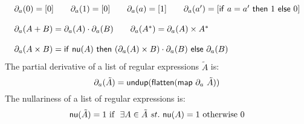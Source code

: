 \begin{definition}
  \begin{displaymath}
    \begin{array}{lll}
\partial_{a}(0) = [0] \qquad \partial_{a}(1) = [0] \qquad \partial_{a}(a) = [1] \qquad \partial_{a}(a') = [\mathsf{if}~a=a'~\mathsf{then}~1~\mathsf{else}~0]\\\\
\partial_{a}(A + B) = \partial_{a}(A) \cdot \partial_{a}(B) \qquad
\partial_{a}(A^*) = \partial_{a}(A) \times  A^*
\\\\
\partial_{a}(A \times B) = \mathsf{if}~\mathsf{nu}(A)~\mathsf{then}~ (\partial_{a}(A) \times B) \cdot \partial_{a}(B)~\mathsf{else}~\partial_{a}(B)
    \end{array}
  \end{displaymath}
The partial derivative of a list of regular expressions $\tilde{A}$ is:
\[\partial_{a}(\tilde{A}) = \mathsf{undup}(\mathsf{flatten}(\mathsf{map}~\partial_a~\tilde{A}))\]
The nullariness of a list of regular expressions is:
\[\mathsf{nu}(\tilde{A}) = 1 ~\text{if }~\exists A \in \tilde{A}~st. ~ \mathsf{nu}(A)=1 \text{ otherwise } 0\]
\end{definition}
